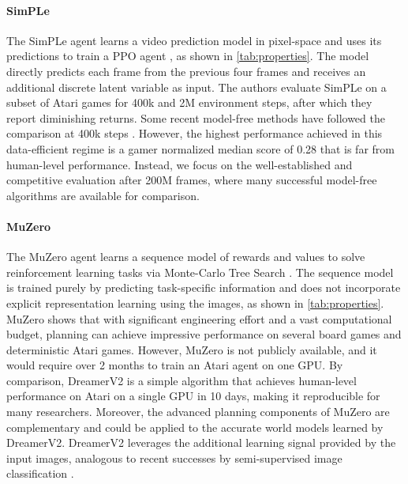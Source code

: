 

\paragraph{SimPLe}

The SimPLe agent \citep{kaiser2019simple} learns a video prediction model in pixel-space and uses its predictions to train a PPO agent \citep{schulman2017ppo}, as shown in \cref{tab:properties}. The model directly predicts each frame from the previous four frames and receives an additional discrete latent variable as input. The authors evaluate SimPLe on a subset of Atari games for 400k and 2M environment steps, after which they report diminishing returns. Some recent model-free methods have followed the comparison at 400k steps \citep{srinivas2020curl,kostrikov2020drq}. However, the highest performance achieved in this data-efficient regime is a gamer normalized median score of 0.28 \citep{kostrikov2020drq} that is far from human-level performance. Instead, we focus on the well-established and competitive evaluation after 200M frames, where many successful model-free algorithms are available for comparison.

\paragraph{MuZero}

The MuZero agent \citep{schrittwieser2019muzero} learns a sequence model of rewards and values \citep{oh2017vpn} to solve reinforcement learning tasks via Monte-Carlo Tree Search \citep[MCTS;][]{coulom2006efficient,silver2017alphago}. The sequence model is trained purely by predicting task-specific information and does not incorporate explicit representation learning using the images, as shown in \cref{tab:properties}. MuZero shows that with significant engineering effort and a vast computational budget, planning can achieve impressive performance on several board games and deterministic Atari games. However, MuZero is not publicly available, and it would require over 2 months to train an Atari agent on one GPU. By comparison, DreamerV2 is a simple algorithm that achieves human-level performance on Atari on a single GPU in 10 days, making it reproducible for many researchers. Moreover, the advanced planning components of MuZero are complementary and could be applied to the accurate world models learned by DreamerV2. DreamerV2 leverages the additional learning signal provided by the input images, analogous to recent successes by semi-supervised image classification \citep{chen2020simclr,he2020moco,grill2020byol}.
